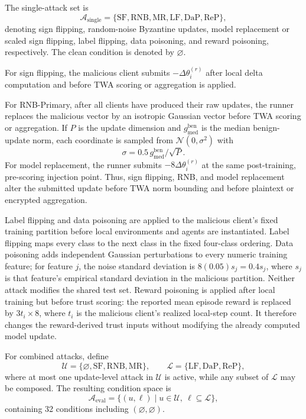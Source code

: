 \documentclass{article}
\begin{document}
The single-attack set is
\[
\mathcal{A}_{\mathrm{single}}
=
\{\mathrm{SF},\mathrm{RNB},\mathrm{MR},\mathrm{LF},\mathrm{DaP},\mathrm{ReP}\},
\]
denoting sign flipping, random-noise Byzantine updates, model replacement or
scaled sign flipping, label flipping, data poisoning, and reward poisoning,
respectively. The clean condition is denoted by $\varnothing$.

For sign flipping, the malicious client submits
$-\Delta\theta_i^{(r)}$ after local delta computation and before TWA scoring
or aggregation is applied.

For RNB-Primary, after all clients have produced their raw updates, the runner
replaces the malicious vector by an isotropic Gaussian vector before TWA
scoring or aggregation. If $P$ is the update dimension and
$g_{\mathrm{med}}^{\mathrm{ben}}$ is the median benign-update norm, each
coordinate is sampled from $\mathcal{N}(0,\sigma^2)$ with
\[
\sigma=0.5\,g_{\mathrm{med}}^{\mathrm{ben}}/\sqrt{P}.
\]
For model replacement, the runner submits
$-8\Delta\theta_i^{(r)}$ at the same post-training, pre-scoring injection
point. Thus, sign flipping, RNB, and model replacement alter the submitted
update before TWA norm bounding and before plaintext or encrypted aggregation.

Label flipping and data poisoning are applied to the malicious client's fixed
training partition before local environments and agents are instantiated.
Label flipping maps every class to the next class in the fixed four-class
ordering. Data poisoning adds independent Gaussian perturbations to every
numeric training feature; for feature $j$, the noise standard deviation is
$8(0.05)s_j=0.4s_j$, where $s_j$ is that feature's empirical standard
deviation in the malicious partition. Neither attack modifies the shared test
set. Reward poisoning is applied after local training but before trust scoring:
the reported mean episode reward is replaced by $3t_i\times8$, where $t_i$ is
the malicious client's realized local-step count. It therefore changes the
reward-derived trust inputs without modifying the already computed model
update.

For combined attacks, define
\[
\mathcal{U}=\{\varnothing,\mathrm{SF},\mathrm{RNB},\mathrm{MR}\},
\qquad
\mathcal{L}=\{\mathrm{LF},\mathrm{DaP},\mathrm{ReP}\},
\]
where at most one update-level attack in $\mathcal{U}$ is active, while any
subset of $\mathcal{L}$ may be composed. The resulting condition space is
\[
\mathcal{A}_{\mathrm{eval}}
=
\{(u,\ell)\mid u\in\mathcal{U},\ \ell\subseteq\mathcal{L}\},
\]
containing 32 conditions including $(\varnothing,\varnothing)$.
\end{document}
